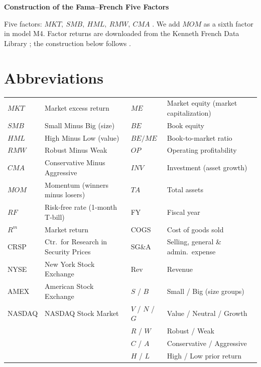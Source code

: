\documentclass[11pt]{article}
\newcommand{\MKT}{\mathit{MKT}}
\newcommand{\SMB}{\mathit{SMB}}
\newcommand{\HML}{\mathit{HML}}
\newcommand{\RMW}{\mathit{RMW}}
\newcommand{\CMA}{\mathit{CMA}}
\newcommand{\MOM}{\mathit{MOM}}
\newcommand{\RF}{\mathit{RF}}
\newcommand{\ME}{\mathit{ME}}
\newcommand{\BE}{\mathit{BE}}
\newcommand{\OP}{\mathit{OP}}
\newcommand{\INV}{\mathit{INV}}
\newcommand{\TA}{\mathit{TA}}
\begin{document}
\begin{center}{\large\bfseries Construction of the Fama--French Five Factors}\end{center}

Five factors: $\MKT,\ \SMB,\ \HML,\ \RMW,\ \CMA$ \cite{ff15}. We add $\MOM$ \cite{c97} as a sixth factor in model M4.
Factor returns are downloaded from the Kenneth French Data Library \cite{kf}; the construction below follows \cite{ff15,kf}.

\section*{Abbreviations}
\begin{center}\footnotesize
\begin{tabular}{ll@{\qquad}ll}
\toprule
$\MKT$ & Market excess return & $\ME$ & Market equity (market capitalization) \\
$\SMB$ & Small Minus Big (size) & $\BE$ & Book equity \\
$\HML$ & High Minus Low (value) & $\BE/\ME$ & Book-to-market ratio \\
$\RMW$ & Robust Minus Weak & $\OP$ & Operating profitability \\
$\CMA$ & Conservative Minus Aggressive & $\INV$ & Investment (asset growth) \\
$\MOM$ & Momentum (winners minus losers) & $\TA$ & Total assets \\
$\RF$ & Risk-free rate (1-month T-bill) & FY & Fiscal year \\
$R^m$ & Market return & COGS & Cost of goods sold \\
CRSP & Ctr.\ for Research in Security Prices & SG\&A & Selling, general \& admin.\ expense \\
NYSE & New York Stock Exchange & Rev & Revenue \\
AMEX & American Stock Exchange & $S$ / $B$ & Small / Big (size groups) \\
NASDAQ & NASDAQ Stock Market & $V$ / $N$ / $G$ & Value / Neutral / Growth \\
 & & $R$ / $W$ & Robust / Weak \\
 & & $C$ / $A$ & Conservative / Aggressive \\
 & & $H$ / $L$ & High / Low prior return \\
\bottomrule
\end{tabular}
\end{center}
\end{document}
